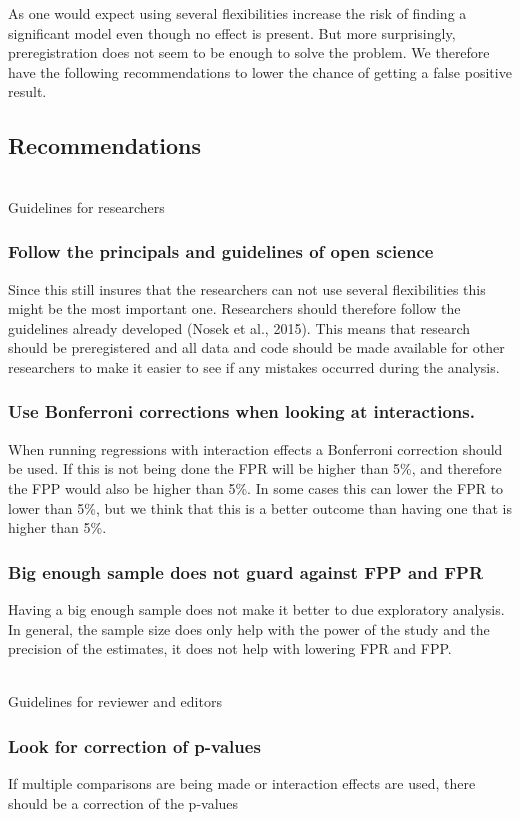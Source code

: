 As one would expect using several flexibilities increase the risk of finding a significant model even though no effect is present. But more surprisingly, preregistration does not seem to be enough to solve the problem. We therefore have the following recommendations to lower the chance of getting a false positive result. 

\subsection{Recommendations}
\hfill\\
Guidelines for researchers 
\hfill\\
\subsubsection{Follow the principals and guidelines of open science}
Since this still insures that the researchers can not use several flexibilities this might be the most important one. Researchers should therefore follow the guidelines already developed (Nosek et al., 2015). This means that research should be preregistered and all data and code should be made available for other researchers to make it easier to see if any mistakes occurred during the analysis. 
\subsubsection{Use Bonferroni corrections when looking at interactions.}
When running regressions with interaction effects a Bonferroni correction should be used. If this is not being done the FPR will be higher than 5\%, and therefore the FPP would also be higher than 5\%. In some cases this can lower the FPR to lower than 5\%, but we think that this is a better outcome than having one that is higher than 5\%. 
\subsubsection{Big enough sample does not guard against FPP and FPR}
Having a big enough sample does not make it better to due exploratory analysis. In general, the sample size does only help with the power of the study and the precision of the estimates, it does not help with lowering FPR and FPP. 

\hfill\\
Guidelines for reviewer and editors
\hfill\\
\subsubsection{Look for correction of p-values}
If multiple comparisons are being made or interaction effects are used, there should be a correction of the p-values
